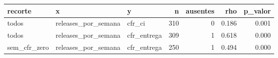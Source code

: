 \begin{tabular}{lllrrrr}
\toprule
recorte & x & y & n & ausentes & rho & p_valor \\
\midrule
todos & releases_por_semana & cfr_ci & 310 & 0 & 0.186 & 0.001 \\
todos & releases_por_semana & cfr_entrega & 309 & 1 & 0.618 & 0.000 \\
sem_cfr_zero & releases_por_semana & cfr_entrega & 250 & 1 & 0.494 & 0.000 \\
\bottomrule
\end{tabular}
